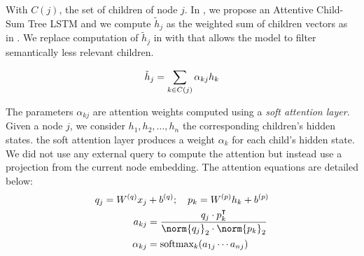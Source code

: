 
With $C(j)$, the set of children of node $j$. In \textcite{simoulin_2021a}, we propose an Attentive Child-Sum Tree LSTM and we compute $\tilde{h}_j$ as the weighted sum of children vectors as in \textcite{zhou_16}. We replace computation of $\tilde{h}_j$ in  with  that allows the model to filter semantically less relevant children.

\begin{equation}
    \tilde{h}_j = \sum_{k \in C(j)} \alpha_{kj} h_k \labeq{treelstm-att} 
\end{equation}

The parameters $\alpha_{kj}$ are attention weights computed using a \emph{soft attention layer}. Given a node $j$, we consider $h_1, h_2, \dots, h_{n}$ the corresponding children's hidden states. the soft attention layer produces a weight $\alpha_k$ for each child's hidden state. We did not use any external query to compute the attention but instead use a projection from the current node embedding. The attention equations are detailed below:
\begin{align}
    q_j = W^{(q)}x_j& +b^{(q)} ;\quad p_k = W^{(p)}h_k +b^{(p)} \\
    a_{kj} &= \frac{q_j \cdot p_k^{\intercal}}{\norm{q_j}_2\cdot\norm{p_k}_2} \label{eq:attention-w} \\
    \alpha_{kj} &= \text{softmax}_k(a_{1j} \cdots a_{nj})
\end{align}

